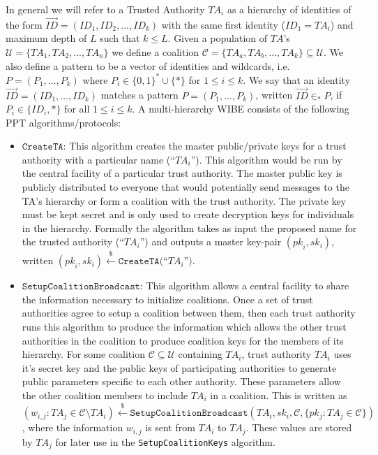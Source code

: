 \documentclass[10pt]{llncs}
\newcommand{\C}{\mathcal{C}}
\newcommand{\U}{\mathcal{U}}
\newcommand{\ID}{\mathit{ID}}
\newcommand{\TA}{\mathit{TA}}
\newcommand{\pk}{\mathit{pk}}
\newcommand{\sk}{\mathit{sk}}
\newcommand{\getsr}{\stackrel{{\scriptscriptstyle\$}}{\gets}}
\begin{document}
In general we will refer to a Trusted Authority $\TA_i$ as a
hierarchy of identities of the form $\vec{\ID} = (\ID_1, \ID_2, ...,
\ID_k)$ with the same first identity ($\ID_1 = \TA_i$) and maximum
depth of $L$ such that $k \le L$. Given a population of $\TA$'s $\U
= \{\TA_1, \TA_2, ..., \TA_n\}$ we define a coalition $\C = \{\TA_a,
\TA_b, ..., \TA_k\} \subseteq \U$. We also define a pattern to be
a vector of identities and wildcards, i.e. $P=(P_{1},\ldots,P_k)$
where $P_{i} \in \{0,1\}^{*} \cup \{*\}$ for $1\leq i\leq k$. We say
that an identity $\vec{\ID} = (\ID_{1},\ldots,\ID_{k})$ matches a
pattern $P=(P_{1},\ldots,P_{k})$, written $\vec{\ID} \in_{*} P$, if
$P_{i} \in \{ \ID_{i}, *\}$ for all $1\leq i\leq k$. A
multi-hierarchy WIBE consists of the following PPT
algorithms/protocols:

\begin{itemize}

\item $\texttt{CreateTA}$: This algorithm creates the master
 public/private keys for a trust authority with a particular
 name (``$\TA_i$''). This algorithm would be run by the central
 facility of a particular trust authority. The master public key
 is publicly distributed to everyone that would potentially send
 messages to the TA's hierarchy or form a coalition with the
 trust authority. The private key must be kept secret and is
 only used to create decryption keys for individuals in the
 hierarchy. Formally the algorithm takes as input the proposed
 name for the trusted authority (``$\TA_i$'') and outputs a
 master key-pair $(\pk_i, \sk_i)$, written $(\pk_i, \sk_i)
 \getsr \texttt{CreateTA}($``$\TA_i$''$)$.
\medskip

\item $\texttt{SetupCoalitionBroadcast}$: This algorithm allows a
central facility to share the information necessary to
initialize coalitions. Once a set of trust authorities agree to
setup a coalition between them, then each trust authority runs
this algorithm to produce the information which allows the other
trust authorities in the coalition to produce coalition keys for
the members of its hierarchy. For some coalition $\C \subseteq
\U$ containing $\TA_i$, trust authority $\TA_i$ uses it's secret
key and the public keys of participating authorities to generate
public parameters specific to each other authority. These
parameters allow the other coalition members to include $\TA_i$
in a coalition. This is written as $(w_{i,j}: \TA_j \in \C
\setminus \TA_i) \getsr \texttt{SetupCoalitionBroadcast}(\TA_i,sk_{i}, \C, \{pk_j :
\TA_j \in \C\})$, where the information $w_{i,j}$ is sent from
$\TA_i$ to $\TA_j$. These values are stored by $\TA_j$ for later
use in the \texttt{SetupCoalitionKeys} algorithm.
\medskip


\end{itemize}
\end{document}
